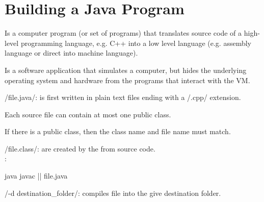 \section{Building a Java Program}
\begin{defnbox}\nospacing
  \begin{defn}[Compiler]
    Is a computer program (or set of programs) that translates source code of a high-level programming language, e.g. C++ into a low level language (e.g. assembly language or direct into machine language).
  \end{defn}
\end{defnbox}
\begin{defnbox}\nospacing
  \begin{defn}
    Is a software application that simulates a computer, but hides the underlying operating system and hardware from the programs that
    interact with the VM.
  \end{defn}
\end{defnbox}
\begin{sectionbox}\nospacing
\begin{itemizenosep}
    \item {} \javainline/file.java/: is first written in plain
  text files ending with a \javainline/.cpp/ extension.\\
  \begin{numberlist}
      \item Each source file can contain at most one public class.
      \item If there is a public class, then the class name and file name must match.
  \end{numberlist}
    \item {} \javainline/file.class/: are created by the   from
  source code.\\
  :
  \begin{mintlinebox}{java}
		javac || file.java
  \end{mintlinebox}
\end{itemizenosep}  
\end{sectionbox}
\begin{sectionbox}\nospacing
  \begin{itemizenosep}
      \item \javainline/-d destination_folder/: compiles file into the give
    destination folder.
  \end{itemizenosep}
\end{sectionbox}
